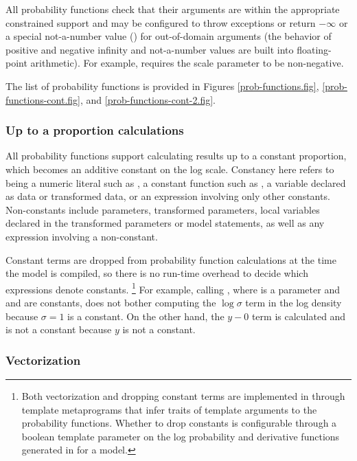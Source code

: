 \documentclass[article]{jss}
\begin{document}
All probability functions check that their arguments are within the
appropriate constrained support and may be configured to throw
exceptions or return $-\infty$ or a special not-a-number value
() for out-of-domain arguments (the behavior of positive and
negative infinity and not-a-number values are built into
floating-point arithmetic).  For example,
   requires the scale parameter
 to be non-negative.

The list of probability functions is provided in Figures
\ref{prob-functions.fig}, \ref{prob-functions-cont.fig}, and
\ref{prob-functions-cont-2.fig}. 

\subsubsection{Up to a proportion calculations}

All probability functions support calculating results up to a constant
proportion, which becomes an additive constant on the log scale.
Constancy here refers to being a numeric literal such as , a
constant function such as , a variable declared as data or
transformed data, or an expression involving only other constants.
Non-constants include parameters, transformed parameters, local
variables declared in the transformed parameters or model statements,
as well as any expression involving a non-constant. 

Constant terms are dropped from probability function calculations at
the time the model is compiled, so there is no run-time overhead to
decide which expressions denote constants.%
%
\footnote{Both vectorization and dropping constant terms are
  implemented in  through template metaprograms that
  infer traits of template arguments to the probability functions.
  Whether to drop constants is configurable through a boolean template
  parameter on the log probability and derivative functions generated
  in  for a model.}
%
For example, calling , where  is a
parameter and  and  are constants, does not bother
computing the $\log \sigma$ term in the log density because $\sigma=1$
is a constant.  On the other hand, the $y - 0$ term is calculated and
is not a constant because $y$ is not a constant.

\subsubsection{Vectorization}
\end{document}
